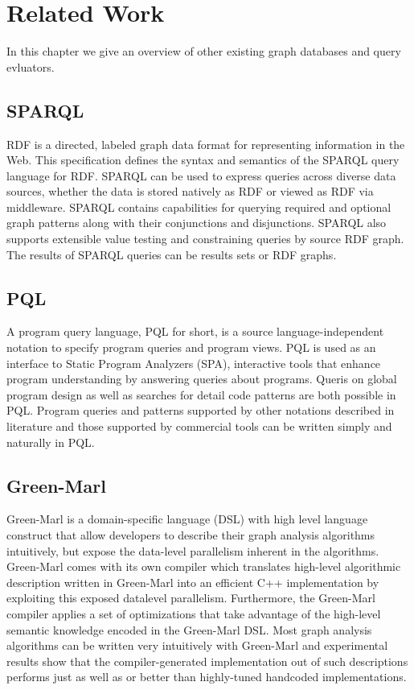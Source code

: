 \documentclass[11pt,singlecolumn]{scrartcl}
\begin{document}
\section{Related Work}
In this chapter we give an overview of other existing graph databases and query evluators.

\subsection{SPARQL}
RDF is a directed, labeled graph data format for representing information in the Web. This specification defines the syntax and semantics of the SPARQL query language for RDF. SPARQL can be used to express queries across diverse data sources, whether the data is stored natively as RDF or viewed as RDF via middleware. SPARQL contains capabilities for querying required and optional graph patterns along with their conjunctions and disjunctions. SPARQL also supports extensible value testing and constraining queries by source RDF graph. The results of SPARQL queries can be results sets or RDF graphs.\cite{SPARQL}
\subsection{PQL}
A program query language, PQL for short, is a source language-independent notation to specify program queries and program views. PQL is used as an interface to Static Program Analyzers (SPA), interactive tools that enhance program understanding by answering queries about programs. Queris on global program design as well as searches for detail code patterns are both possible in PQL. Program queries and patterns supported by other notations described in literature and those supported by commercial tools can be written simply and naturally in PQL.\cite {PQL}



\subsection{Green-Marl}
Green-Marl is a domain-specific language (DSL) with high level language construct that allow developers to describe their graph analysis algorithms intuitively, but expose the data-level parallelism inherent in the algorithms. Green-Marl comes with its own compiler which translates high-level algorithmic description written in Green-Marl into an efficient C++ implementation by exploiting this exposed datalevel parallelism. Furthermore, the Green-Marl compiler applies a set of optimizations that take advantage of the high-level semantic knowledge encoded in the Green-Marl DSL. Most graph analysis algorithms can be written very intuitively with Green-Marl and experimental results show that the compiler-generated implementation out of such descriptions performs just as well as or better than highly-tuned handcoded implementations.\cite {Greenmarl}
\end{document}
